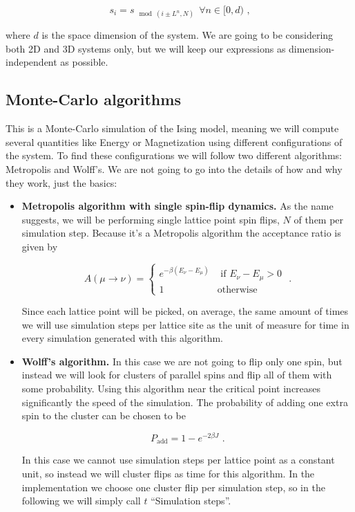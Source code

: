 \documentclass[8 pt, twocolumn]{article}
\begin{document}
\begin{equation} s_i = s_{\mod(i\pm L^n, N)} ~~ \forall n \in [0,d) \text{ ,} \end{equation}

where $d$ is the space dimension of the system. We are going to be considering both 2D and 3D systems only, but we will keep our expressions as dimension-independent as possible.

\subsection{Monte-Carlo algorithms}

This is a Monte-Carlo simulation of the Ising model, meaning we will compute several quantities like Energy or Magnetization using different configurations of the system. To find these configurations we will follow two different algorithms: Metropolis and Wolff's. We are not going to go into the details of how and why they work, just the basics:

\begin{itemize}
  \item \textbf{Metropolis algorithm with single spin-flip dynamics.} As the name suggests, we will be performing single lattice point spin flips, $N$ of them per simulation step. Because it's a Metropolis algorithm the acceptance ratio is given by

  \begin{equation} A(\mu \rightarrow \nu) = \left\{ \begin{matrix} e^{-\beta(E_\nu-E_\mu)} & \text{ if } E_\nu - E_\mu > 0 \\
  1 & \text{otherwise} \end{matrix} \right. \text{ .} \end{equation}

  Since each lattice point will be picked, on average, the same amount of times we will use simulation steps per lattice site as the unit of measure for time in every simulation generated with this algorithm.

  \item \textbf{Wolff's algorithm.} In this case we are not going to flip only one spin, but instead we will look for clusters of parallel spins and flip all of them with some probability. Using this algorithm near the critical point increases significantly the speed of the simulation. The probability of adding one extra spin to the cluster can be chosen to be

  \begin{equation} P_{\text{add}} = 1 - e^{-2\beta J} \text{ .} \end{equation}

  In this case we cannot use simulation steps per lattice point as a constant unit, so instead we will  cluster flips as time for this algorithm. In the implementation we choose one cluster flip per simulation step, so in the following we will simply call $t$ ``Simulation steps''.
\end{itemize}
\end{document}
